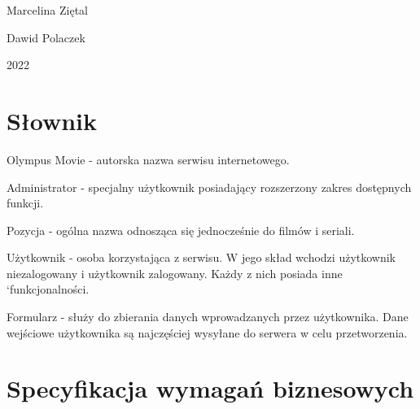 \documentclass[12pt]{article}
\begin{document}
\begin{titlepage}
\begin{minipage}{0.4\textwidth}
\begin{flushright}
			Marcelina Ziętal
			
			Dawid Polaczek
		\end{flushright}
	\end{minipage}
	
	
	\vspace{\fill}
	2022
	
	
	
\end{titlepage}
\begin{flushleft}

	
	\tableofcontents
	\pagebreak
	

	\section{Słownik}	%
		Olympus Movie - autorska nazwa serwisu internetowego.
		
		Administrator - specjalny użytkownik posiadający rozszerzony zakres dostępnych funkcji.
		
		Pozycja - ogólna nazwa odnosząca się jednocześnie do filmów i seriali.
		
		Użytkownik - osoba korzystająca z serwisu. W jego skład wchodzi użytkownik niezalogowany i użytkownik zalogowany. Każdy z nich posiada inne `funkcjonalności.
		
		Formularz -  służy do zbierania danych wprowadzanych przez użytkownika. Dane wejściowe użytkownika są najczęściej wysyłane do serwera w celu przetworzenia.
		
\pagebreak
	\section{Specyfikacja wymagań biznesowych}
	

\end{flushleft}
\end{document}
